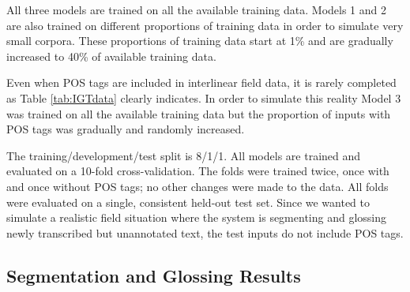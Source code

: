 All three models are trained on all the available training data. Models 1 and 2 are also trained on different proportions of training data in order to simulate very small corpora. These proportions of training data start at 1\% and are gradually increased to 40\% of available training data. 

Even when POS tags are included in interlinear field data, it is rarely completed as Table \ref{tab:IGTdata} clearly indicates.%
In order to simulate this reality Model 3 was trained on all the available training data but the proportion of inputs with POS tags was gradually and randomly increased.

The training/development/test split is 8/1/1. All models are trained and evaluated on a 10-fold cross-validation. The folds were trained twice, once with and once without POS tags; no other changes were made to the data. All folds were evaluated on a single, consistent held-out test set. Since we wanted to simulate a realistic field situation where the system is segmenting and glossing newly transcribed but unannotated text, the test inputs do not include POS tags. 


\subsection{Segmentation and Glossing Results}
\label{sec:segglsresults}


